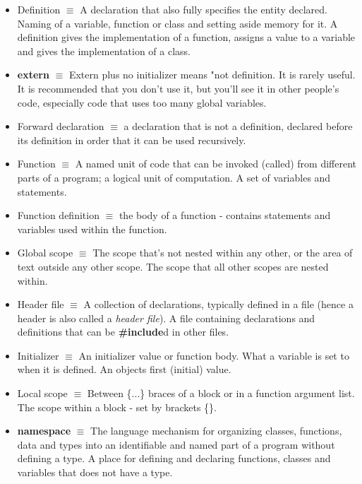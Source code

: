 \documentclass[12pt]{article}
\begin{document}
\begin{itemize}
\item Definition $\equiv$ A declaration that also fully specifies the entity declared. Naming of a variable, function or class and setting aside memory for it. A definition gives the implementation of a function, assigns a value to a variable and gives the implementation of a class.

\item \textbf{extern} $\equiv$ Extern plus no initializer means "not definition. It is rarely useful. It is recommended that you don't use it, but you'll see it in other people's code, especially code that uses too many global variables.

\item Forward declaration $\equiv$ a declaration that is not a definition, declared before its definition in order that it can be used recursively.

\item Function $\equiv$ A named unit of code that can be invoked (called) from different parts of a program; a logical unit of computation. A set of variables and statements.

\item Function definition $\equiv$ the body of a function - contains statements and variables used within the function.

\item Global scope $\equiv$ The scope that's not nested within any other, or the area of text outside any other scope. The scope that all other scopes are nested within.

\item Header file $\equiv$ A collection of declarations, typically defined in a file (hence a header is also called a \textit{header file}). A file containing declarations and definitions that can be \textbf{\#include}d in other files.

\item Initializer $\equiv$ An initializer value or function body. What a variable is set to when it is defined. An objects first (initial) value.

\item Local scope $\equiv$ Between \{...\} braces of a block or in a function argument list. The scope within a block - set by brackets \{\}.

\item \textbf{namespace} $\equiv$ The language mechanism for organizing classes, functions, data and types into an identifiable and named part of a program without defining a type. A place for defining and declaring functions, classes and variables that does not have a type.


\end{itemize}
\end{document}
